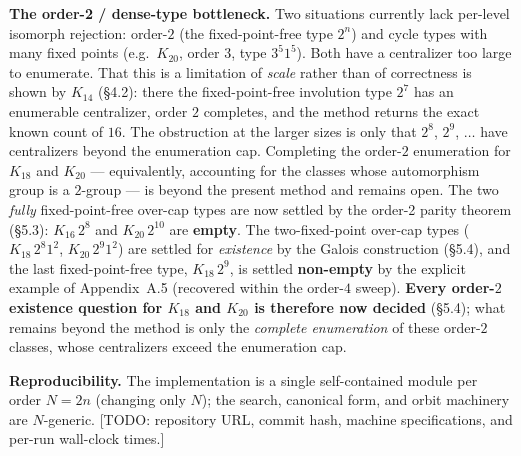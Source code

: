 \documentclass[11pt,reqno]{amsart}
\theoremstyle{plain}
\theoremstyle{definition}
\numberwithin{theorem}{section}
\begin{document}
\medskip
\noindent\textbf{The order-2 / dense-type bottleneck.} Two situations currently lack per-level
isomorph rejection: order-$2$ (the fixed-point-free type $2^n$) and cycle types with
many fixed points (e.g.\ $K_{20}$, order $3$, type $3^5 1^5$). Both have a centralizer
too large to enumerate. That this is a limitation of \emph{scale} rather than of
correctness is shown by $K_{14}$ (\S4.2): there the fixed-point-free involution type
$2^7$ has an enumerable centralizer, order $2$ completes, and the method returns the
exact known count of $16$. The obstruction at the larger sizes is only that $2^8$,
$2^9$, $\dots$ have centralizers beyond the enumeration cap. Completing the order-$2$
enumeration for $K_{18}$ and $K_{20}$ --- equivalently, accounting for the classes whose
automorphism group is a $2$-group --- is beyond the present method and remains open.
The two \emph{fully} fixed-point-free over-cap types are now settled by the order-2 parity
theorem (\S5.3): $K_{16}\,2^8$ and $K_{20}\,2^{10}$ are \textbf{empty}. The two-fixed-point
over-cap types ($K_{18}\,2^8 1^2$, $K_{20}\,2^9 1^2$) are settled for \emph{existence} by the
Galois construction (\S5.4), and the last fixed-point-free type, $K_{18}\,2^9$, is settled
\textbf{non-empty} by the explicit example of Appendix~A.5 (recovered within the order-$4$
sweep). \textbf{Every order-$2$ existence question for $K_{18}$ and $K_{20}$ is therefore now
decided} (\S5.4); what remains beyond the method is only the \emph{complete enumeration} of
these order-$2$ classes, whose centralizers exceed the enumeration cap.

\medskip
\noindent\textbf{Reproducibility.} The implementation is a single self-contained module per order
$N=2n$ (changing only $N$); the search, canonical form, and orbit machinery are
$N$-generic. [TODO: repository URL, commit hash, machine specifications, and per-run
wall-clock times.]
\end{document}
